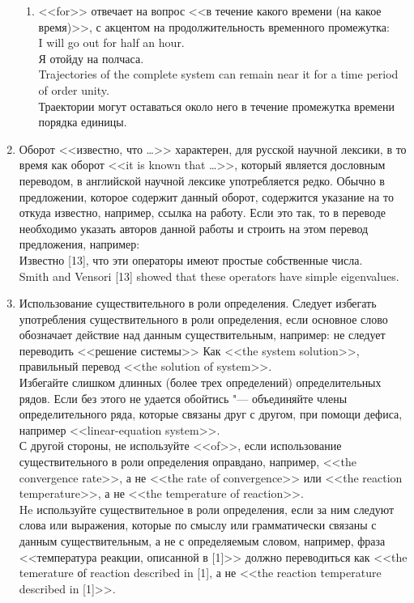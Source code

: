 \documentclass[a5paper, 10pt, twoside, numbers=enddot]{scrartcl}
\begin{document}
\begin{enumerate}
\begin{enumerate}
    \item <<for>> отвечает на вопрос <<в течение какого времени (на какое время)>>, с акцентом на продолжительность временного промежутка:\\ [4pt]
    \textsf{I will go out for half an hour.\\
    Я отойду на полчаса.\\ [4pt]
    Trajectories of the complete system can remain near it for a time period of order unity.\\
    Траектории могут оставаться около него в течение промежутка времени порядка единицы.}
  \end{enumerate}
  
  \item Оборот <<известно, что \ldots>> характерен, для русской научной лексики, в то  время как оборот <<it is known that \ldots>>, который является дословным переводом, в английской научной лексике употребляется редко. Обычно в предложении, которое содержит данный оборот, содержится указание на то откуда известно, например, ссылка на работу. Если это так, то в переводе необходимо указать авторов данной работы и строить на этом перевод предложения, например: \\ [4pt]
  \textsf{Известно [13], что эти операторы имеют простые собственные числа.\\
  Smith and Vensori [13] showed that these operators have simple eigenvalues.}

  \item Использование существительного в роли определения. Следует избегать  употребления существительного в роли определения, если основное слово  обозначает действие над данным существительным, например: не следует  переводить <<решение системы>> Как <<the system solution>>, правильный перевод <<the solution of system>>.\\ [4pt]
  Избегайте слишком длинных (более трех определений) определительных рядов. Если без этого не удается обойтись "--- объединяйте члены определительного ряда, которые связаны друг с другом, при помощи дефиса, например <<linear-equation system>>.\\ [4pt] 
  С другой стороны, не используйте <<of>>,  если использование существительного в роли определения оправдано, например, <<the convergence rate>>, а не <<the rate of convergence>> или <<the reaction temperature>>, а не <<the temperature of reaction>>.\\ [4pt]
  He используйте существительное в роли определения, если за ним следуют слова или выражения, которые по смыслу или грамматически связаны с данным существительным, а не с определяемым словом, например, фраза <<температура реакции, описанной в [1]>> должно переводиться как <<the temerature оf reaction described in [1], а не <<the reaction temperature described in [1]>>.
  

\end{enumerate}
\end{document}

